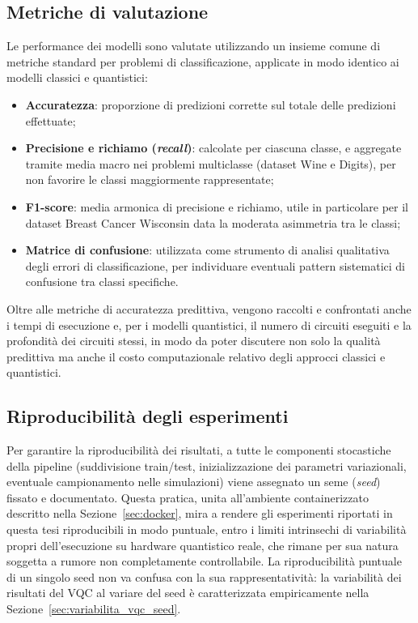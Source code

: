 \subsection{Metriche di valutazione}
Le performance dei modelli sono valutate utilizzando un insieme comune di metriche standard per problemi di classificazione, applicate in modo identico ai modelli classici e quantistici:
\begin{itemize}
    \item \textbf{Accuratezza}: proporzione di predizioni corrette sul totale delle predizioni effettuate;
    \item \textbf{Precisione e richiamo (\textit{recall})}: calcolate per ciascuna classe, e aggregate tramite media macro nei problemi multiclasse (dataset Wine e Digits), per non favorire le classi maggiormente rappresentate;
    \item \textbf{F1-score}: media armonica di precisione e richiamo, utile in particolare per il dataset Breast Cancer Wisconsin data la moderata asimmetria tra le classi;
    \item \textbf{Matrice di confusione}: utilizzata come strumento di analisi qualitativa degli errori di classificazione, per individuare eventuali pattern sistematici di confusione tra classi specifiche.
\end{itemize}

Oltre alle metriche di accuratezza predittiva, vengono raccolti e confrontati anche i tempi di esecuzione e, per i modelli quantistici, il numero di circuiti eseguiti e la profondità dei circuiti stessi, in modo da poter discutere non solo la qualità predittiva ma anche il costo computazionale relativo degli approcci classici e quantistici.

\subsection{Riproducibilità degli esperimenti}
\label{sec:riproducibilita_esperimenti}
Per garantire la riproducibilità dei risultati, a tutte le componenti stocastiche della pipeline (suddivisione train/test, inizializzazione dei parametri variazionali, eventuale campionamento nelle simulazioni) viene assegnato un seme (\textit{seed}) fissato e documentato. Questa pratica, unita all'ambiente containerizzato descritto nella Sezione~\ref{sec:docker}, mira a rendere gli esperimenti riportati in questa tesi riproducibili in modo puntuale, entro i limiti intrinsechi di variabilità propri dell'esecuzione su hardware quantistico reale, che rimane per sua natura soggetta a rumore non completamente controllabile. La riproducibilità puntuale di un singolo seed non va confusa con la sua rappresentatività: la variabilità dei risultati del VQC al variare del seed è caratterizzata empiricamente nella Sezione~\ref{sec:variabilita_vqc_seed}.

